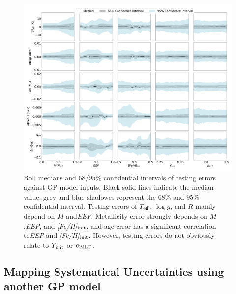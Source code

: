 \begin{figure}
	\includegraphics[width=2.0\columnwidth]{ 5d-testing_vs_inputs.pdf}
    \caption{ Roll medians and 68/95\% confidential intervals of testing errors against GP model  inputs. Black solid lines indicate the median value; grey and blue shadowes represent the 68\% and 95\% confidential interval. Testing errors of $T_{\rm eff}$, $\log g$, and $R$ mainly depend on $M$ and{\it EEP}. Metallicity error strongly depends on $M$,{\it EEP}, and {\it [Fe/H]}$_{\rm init}$, and age error has a significant correlation to{\it EEP} and {\it [Fe/H]}$_{\rm init}$. However, testing errors do not obviously relate to $Y_{\rm init}$ or $\alpha_{\rm MLT}$. } 
  \label{fig:5d_test_vs_input}
\end{figure}
%

\subsection{Mapping Systematical Uncertainties using another GP model}\label{sec:sys}

